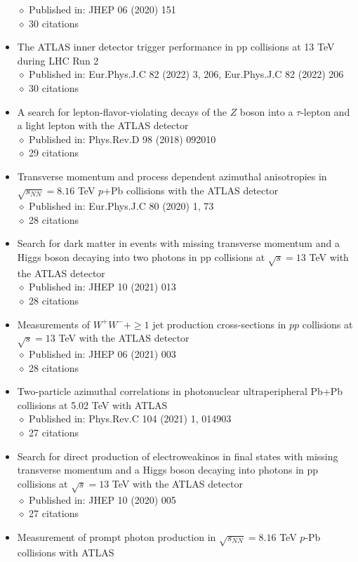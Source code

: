 \documentclass[margin, 10pt]{res} %
\begin{document}
\begin{resume}
\begin{itemize}
$\diamond$ Published in: JHEP 06 (2020) 151\\
$\diamond$ 30 citations
\item The ATLAS inner detector trigger performance in pp collisions at 13 TeV during LHC Run 2\\
$\diamond$ Published in: Eur.Phys.J.C 82 (2022) 3, 206, Eur.Phys.J.C 82 (2022) 206\\
$\diamond$ 30 citations
\item A search for lepton-flavor-violating decays of the $Z$ boson into a $\tau$-lepton and a light lepton with the ATLAS detector\\
$\diamond$ Published in: Phys.Rev.D 98 (2018) 092010\\
$\diamond$ 29 citations
\item Transverse momentum and process dependent azimuthal anisotropies in $\sqrt{s_{NN}} = 8.16$ TeV $p$+Pb collisions with the ATLAS detector\\
$\diamond$ Published in: Eur.Phys.J.C 80 (2020) 1, 73\\
$\diamond$ 28 citations
\item Search for dark matter in events with missing transverse momentum and a Higgs boson decaying into two photons in pp collisions at $\sqrt{s} = 13$ TeV with the ATLAS detector\\
$\diamond$ Published in: JHEP 10 (2021) 013\\
$\diamond$ 28 citations
\item Measurements of $W^{+}W^{-} + \ge 1$ jet production cross-sections in $pp$ collisions at $\sqrt{s} = 13$ TeV with the ATLAS detector\\
$\diamond$ Published in: JHEP 06 (2021) 003\\
$\diamond$ 28 citations
\item Two-particle azimuthal correlations in photonuclear ultraperipheral Pb+Pb collisions at 5.02 TeV with ATLAS\\
$\diamond$ Published in: Phys.Rev.C 104 (2021) 1, 014903\\
$\diamond$ 27 citations
\item Search for direct production of electroweakinos in final states with missing transverse momentum and a Higgs boson decaying into photons in pp collisions at $\sqrt{s} = 13$ TeV with the ATLAS detector\\
$\diamond$ Published in: JHEP 10 (2020) 005\\
$\diamond$ 27 citations
\item Measurement of prompt photon production in $\sqrt{s_{NN}} = 8.16$ TeV $p$-Pb collisions with ATLAS\\

\end{itemize}
\end{resume}
\end{document}
